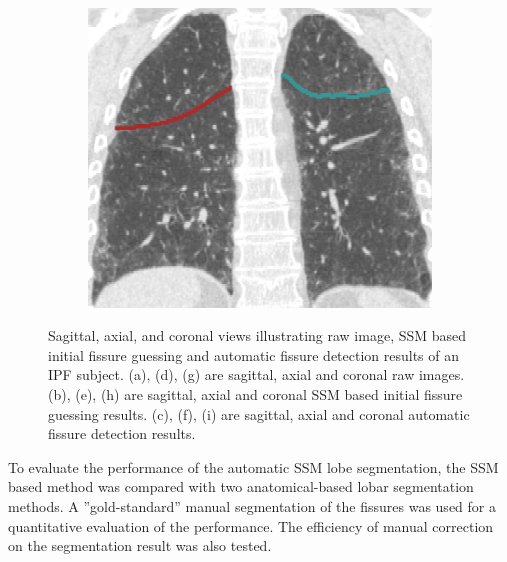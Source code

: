 {\begin{figure}[htbp]
\begin{subfigure}{.32\linewidth}
  \includegraphics[width=\linewidth,trim={{.0\wd0} {.0\wd0} {.0\wd0} {.0\wd0}},clip]{Segmentation/Image/IPF203_FinalResult_Coronal364.png}
  \caption{}
  \label{fig:IPFSegmentationResults-i} 
\end{subfigure}
\caption{Sagittal, axial, and coronal views illustrating raw image, SSM based initial fissure guessing and automatic fissure detection results of an IPF subject. (a), (d), (g) are sagittal, axial and coronal raw images. (b), (e), (h) are sagittal, axial and coronal SSM based initial fissure guessing results. (c), (f), (i) are sagittal, axial and coronal automatic fissure detection results.}
\label{fig:IPFSegmentationResults}
\end{figure}

To evaluate the performance of the automatic SSM lobe segmentation, the SSM based method was compared with two anatomical-based lobar segmentation methods. A ''gold-standard'' manual segmentation of the fissures was used for a quantitative evaluation of the performance. The efficiency of manual correction on the segmentation result was also tested.
\newpage

}

